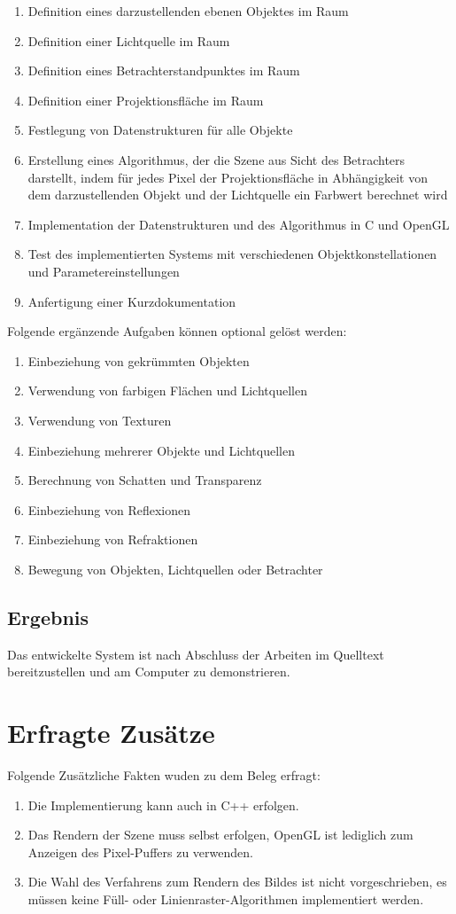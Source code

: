 \documentclass[final,a4paper,11pt,notitlepage,halfparskip]{scrreprt}
\begin{document}
\begin{enumerate}
    \item Definition eines darzustellenden ebenen Objektes im Raum
    \item Definition einer Lichtquelle im Raum
    \item Definition eines Betrachterstandpunktes im Raum
    \item Definition einer Projektionsfläche im Raum
    \item Festlegung von Datenstrukturen für alle Objekte
    \item Erstellung eines Algorithmus, der die Szene aus Sicht des Betrachters darstellt, indem
	für jedes Pixel der Projektionsfläche in Abhängigkeit von dem darzustellenden Objekt
	und der Lichtquelle ein Farbwert berechnet wird
    \item Implementation der Datenstrukturen und des Algorithmus in C und OpenGL
    \item Test des implementierten Systems mit verschiedenen Objektkonstellationen und
	Parametereinstellungen
    \item Anfertigung einer Kurzdokumentation
\end{enumerate}
Folgende ergänzende Aufgaben können optional gelöst werden:
\begin{enumerate}
    \item Einbeziehung von gekrümmten Objekten
    \item Verwendung von farbigen Flächen und Lichtquellen
    \item Verwendung von Texturen
    \item Einbeziehung mehrerer Objekte und Lichtquellen
    \item Berechnung von Schatten und Transparenz
    \item Einbeziehung von Reflexionen
    \item Einbeziehung von Refraktionen
    \item Bewegung von Objekten, Lichtquellen oder Betrachter
\end{enumerate}

\subsection{Ergebnis}
Das entwickelte System ist nach Abschluss der Arbeiten im Quelltext bereitzustellen und am
Computer zu demonstrieren.

\section{Erfragte Zusätze}
Folgende Zusätzliche Fakten wuden zu dem Beleg erfragt:
\begin{enumerate}
    \item Die Implementierung kann auch in C++ erfolgen.
    \item Das Rendern der Szene muss selbst erfolgen, OpenGL ist lediglich zum 
	Anzeigen des Pixel-Puffers zu verwenden.
    \item Die Wahl des Verfahrens zum Rendern des Bildes ist nicht
	vorgeschrieben, es müssen keine Füll- oder Linienraster-Algorithmen
	implementiert werden.	
\end{enumerate}
\end{document}
